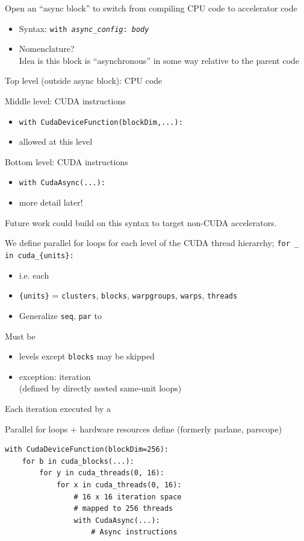 \begin{minipage}[t]{0.48\textwidth}\fixminipage
Open an ``async block'' to switch from compiling CPU code to accelerator code
\begin{itemize}
  \item Syntax: \texttt{with \textit{async\_config}: \textit{body}}
  \item Nomenclature?\\Idea is this block is ``asynchronous'' in some way relative to the parent code
\end{itemize}
\vspace{12mm}
Top level (outside async block): CPU code

Middle level:  CUDA instructions
\begin{itemize}
  \item \texttt{with CudaDeviceFunction(blockDim,...):}
  \item {} allowed at this level
\end{itemize}

Bottom level:  CUDA instructions
\begin{itemize}
  \item \texttt{with CudaAsync(...):}
  \item more detail later!
\end{itemize}
\vspace{12mm}
Future work could build on this syntax to target non-CUDA accelerators.
\end{minipage}
\hfill
\begin{minipage}[t]{0.48\textwidth}\fixminipage
We define parallel for loops for each level of the CUDA thread hierarchy;
\texttt{for \_ in cuda\_\{units\}:}
\begin{itemize}
  \item i.e. each 
  \item \texttt{\{units\}} = \texttt{clusters}, \texttt{blocks}, \texttt{warpgroups}, \texttt{warps}, \texttt{threads}
  \item Generalize \texttt{seq}, \texttt{par} to 
\end{itemize}
Must be 
\begin{itemize}
  \item levels except \texttt{blocks} may be skipped
  \item exception:  iteration\\(defined by directly nested same-unit loops)
\end{itemize}
Each iteration executed by a 

Parallel for loops + hardware resources define  (formerly parlane, parscope)

\begin{verbatim}
with CudaDeviceFunction(blockDim=256):
    for b in cuda_blocks(...):
        for y in cuda_threads(0, 16):
            for x in cuda_threads(0, 16):
                # 16 x 16 iteration space
                # mapped to 256 threads
                with CudaAsync(...):
                    # Async instructions
\end{verbatim}
\end{minipage}
